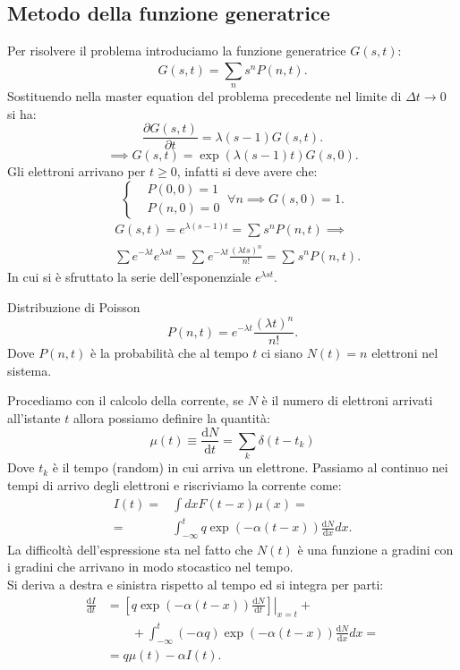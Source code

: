 \subsection{Metodo della funzione generatrice}%
\label{subsec:fgen_met}
Per risolvere il problema introduciamo la funzione generatrice $G(s,t)$:
\[
    G(s,t) =\sum_{n}^{} s^nP(n,t) 
.\] 
Sostituendo nella master equation del problema precedente nel limite di $\Delta t \to 0$ si ha:
\[
    \frac{\partial G(s,t)}{\partial t} = \lambda (s-1) G(s,t)
.\] 
\[
     \implies  G(s,t) = \exp\left(\lambda (s-1) t\right)G(s,0) 
.\] 
Gli elettroni arrivano per $t\ge 0$, infatti si deve avere che: 
\[
    \begin{cases}
	&P(0,0)=1\\
	&P(n,0) = 0
    \end{cases}
    \ \forall n \implies  G(s,0) = 1 
.\] 
\[\begin{aligned}
    &G(s,t) = e^{\lambda (s-1) t} = \sum_{}^{} s^n P(n,t) \implies  \\
    &\sum e^{-\lambda t} e^{\lambda s t} = \sum_{}^{} e^{-\lambda t}\frac{\left(\lambda ts\right)^n }{n!}  = \sum_{}^{} s^nP(n,t) 
.\end{aligned}\]
In cui si è sfruttato la serie dell'esponenziale $e^{\lambda st}$.
\begin{redbox}{Distribuzione di Poisson}
    \[
	P(n,t)= e^{-\lambda t}\frac{\left(\lambda t\right)^{n}}{n!}
    .\] 
    Dove $P(n,t)$ è la probabilità che al tempo $t$ ci siano $N(t) =n$ elettroni nel sistema.
\end{redbox}
\noindent
Procediamo con il calcolo della corrente, se $N$ è il numero di elettroni arrivati all'istante $t$ allora possiamo definire la quantità:
\[
    \mu(t) \equiv 
    \frac{\text{d} N}{\text{d} t} 
    = \sum_k\delta (t-t_k)  
\] 
Dove $t_k$ è il tempo (random) in cui arriva un elettrone.
Passiamo al continuo nei tempi di arrivo degli elettroni e riscriviamo la corrente come:
\[\begin{aligned}
    I(t) =& \int dx F(t-x) \mu(x) =\\
	 =&\int_{- \infty}^{t} q \exp\left(-\alpha (t-x) \right) \frac{\text{d} N}{\text{d} x} dx 
.\end{aligned}\]
La difficoltà dell'espressione sta nel fatto che $N(t)$ è una funzione a gradini con i gradini che arrivano in modo stocastico nel tempo.\\
Si deriva a destra e sinistra rispetto al tempo ed si integra per parti:
\[\begin{aligned}
    \frac{\text{d} I}{\text{d} t} &= \left[q\exp\left(-\alpha (t-x)\right)\left. \frac{\text{d} N}{\text{d} t}\right]  \right|_{x=t} + \\
				   &\qquad +\int_{-\infty}^{t} \left(-\alpha q\right)\exp\left(-\alpha (t-x)\right)\frac{\text{d} N}{\text{d} x} dx =\\
				   &= q\mu (t) - \alpha I(t) 
.\end{aligned}\]
